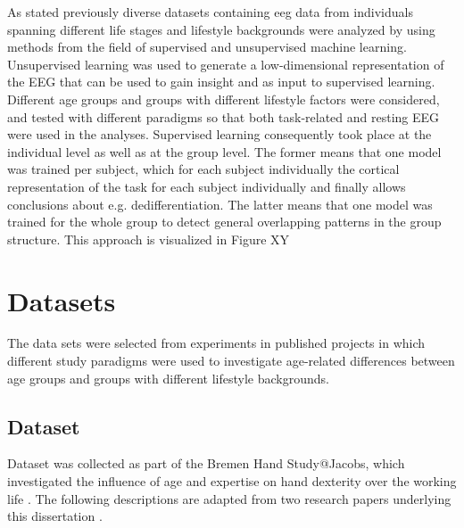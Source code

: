 As stated previously diverse datasets containing \gls{eeg} data from individuals spanning different life stages and lifestyle backgrounds were analyzed by using methods from the field of supervised and unsupervised machine learning. Unsupervised learning was used to generate a low-dimensional representation of the EEG that can be used to gain insight and as input to supervised learning. Different age groups and groups with different lifestyle factors were considered, and tested with different paradigms so that both task-related and resting EEG were used in the analyses. Supervised learning consequently took place at the individual level as well as at the group level. The former means that one model was trained per subject, which for each subject individually the cortical representation of the task for each subject individually and finally allows conclusions about e.g. dedifferentiation. The latter means that one model was trained for the whole group to detect general overlapping patterns in the group structure. This approach is visualized in Figure XY

\section{Datasets}
The data sets were selected from experiments in published projects in which different study paradigms were used to investigate age-related differences between age groups and groups with different lifestyle backgrounds.

\subsection{Dataset }
\label{methods:datasets:I}
Dataset  was collected as part of the Bremen Hand Study@Jacobs, which investigated the influence of age and expertise on hand dexterity over the working life \cite{Voelcker-Rehage2013}. The following descriptions are adapted from two research papers underlying this dissertation \cite{Gaidai2022, Goelz2021a}.

